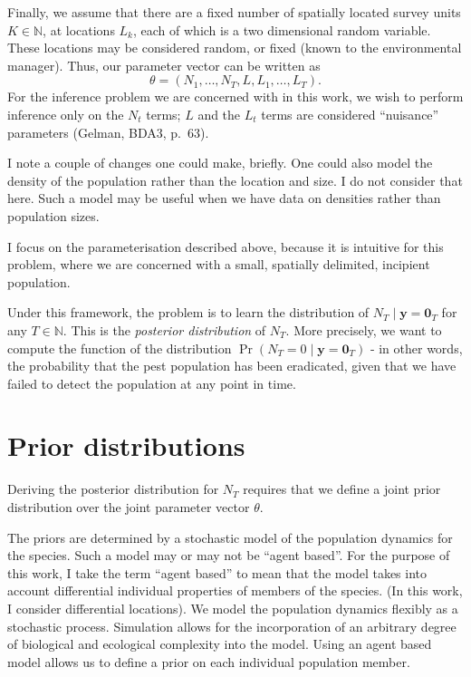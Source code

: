 \documentclass[
]{book}
\begin{document}
Finally, we assume that there are a fixed number of spatially located survey units \(K \in \mathbb N\), at locations \(L_k\), each of which is a two dimensional random variable. These locations may be considered random, or fixed (known to the environmental manager). Thus, our parameter vector can be written as \[
\theta = (N_1, \ldots, N_T, L, L_1, \ldots, L_T).
\] For the inference problem we are concerned with in this work, we wish to perform inference only on the \(N_t\) terms; \(L\) and the \(L_t\) terms are considered ``nuisance'' parameters (Gelman, BDA3, p.~63).

I note a couple of changes one could make, briefly. One could also model the density of the population rather than the location and size. I do not consider that here. Such a model may be useful when we have data on densities rather than population sizes.

I focus on the parameterisation described above, because it is intuitive for this problem, where we are concerned with a small, spatially delimited, incipient population.

Under this framework, the problem is to learn the distribution of \(N_T \mid \mathbf y = \mathbf 0_T\) for any \(T \in \mathbb N\). This is the \emph{posterior distribution} of \(N_T\). More precisely, we want to compute the function of the distribution \(\Pr(N_T = 0 \mid \mathbf y = \mathbf 0_T)\) - in other words, the probability that the pest population has been eradicated, given that we have failed to detect the population at any point in time.

\hypertarget{prior-distributions}{%
\section{Prior distributions}\label{prior-distributions}}

Deriving the posterior distribution for \(N_T\) requires that we define a joint prior distribution over the joint parameter vector \(\theta\).

The priors are determined by a stochastic model of the population dynamics for the species. Such a model may or may not be ``agent based''. For the purpose of this work, I take the term ``agent based'' to mean that the model takes into account differential individual properties of members of the species. (In this work, I consider differential locations). We model the population dynamics flexibly as a stochastic process. Simulation allows for the incorporation of an arbitrary degree of biological and ecological complexity into the model. Using an agent based model allows us to define a prior on each individual population member.
\end{document}
